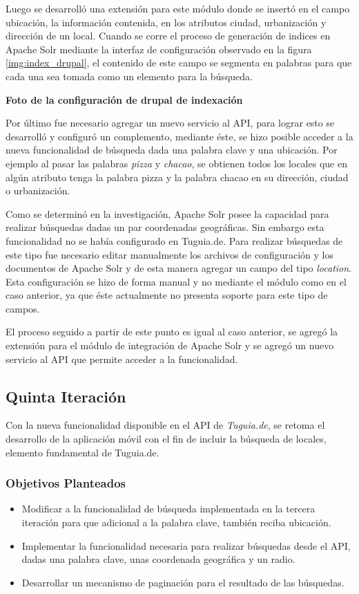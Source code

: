Luego se desarrolló una extensión para este módulo donde se insertó en el campo ubicación, la información contenida, en los atributos ciudad, urbanización y dirección de un local. Cuando se corre el proceso de generación de indices en Apache Solr mediante la interfaz de configuración observado en la figura \ref{img:index_drupal}, el contenido de este campo se segmenta en palabras para que cada una sea tomada como un elemento para la búsqueda.

\textbf{Foto de la configuración de drupal de indexación}

Por último fue necesario agregar un nuevo servicio al API, para lograr esto se desarrolló y configuró un complemento, mediante éste, se hizo posible acceder a la nueva funcionalidad de  búsqueda dada una palabra clave y una ubicación. Por ejemplo al pasar las palabras \textit{pizza} y \textit{chacao}, se obtienen todos los locales que en algún atributo tenga la palabra pizza y la palabra chacao en su dirección, ciudad o urbanización.

Como se determinó en la investigación, Apache Solr posee la capacidad para realizar búsquedas dadas un par coordenadas geográficas. Sin embargo esta funcionalidad no se había configurado en Tuguia.de. Para realizar búsquedas de este tipo fue necesario editar manualmente los archivos de configuración y los documentos de Apache Solr y de esta manera agregar un campo del tipo \textit{location}. Esta configuración se hizo de forma manual y no mediante el módulo como en el caso anterior, ya que éste actualmente no presenta soporte para este tipo de campos. 

El proceso seguido a partir de este punto es igual al caso anterior, se agregó la extensión para el módulo de integración de Apache Solr y se agregó un nuevo servicio al API que permite acceder a la funcionalidad.

\subsection{Quinta Iteración}

Con la nueva funcionalidad disponible en el API de \textit{Tuguia.de}, se retoma el desarrollo de la aplicación móvil con el fin de incluir la búsqueda de locales, elemento fundamental de Tuguia.de.
 
\subsubsection{Objetivos Planteados} 
\begin{itemize}
\item Modificar a la funcionalidad de búsqueda implementada en la tercera iteración para que adicional a la palabra clave, también reciba ubicación.
\item Implementar la funcionalidad necesaria para realizar búsquedas desde el API, dadas una palabra clave, unas coordenada geográfica y un radio.
\item Desarrollar un mecanismo de paginación para el resultado de las búsquedas.
\end{itemize}

